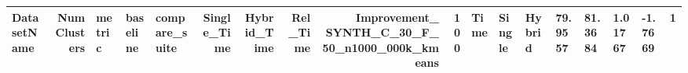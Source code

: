 \begin{tabular}{lrlllrrrrr}
\toprule
DatasetName & NumClusters & metric & baseline & compare_suite & Single_Time & Hybrid_Time & Rel_Time & Improvement_%
\midrule
SYNTH_C_30_F_50_n1000_000k_kmeans & 100 & Time & Single & Hybrid & 79.9557 & 81.3684 & 1.01767 & -1.7669 & 1 \\
\bottomrule
\end{tabular}
